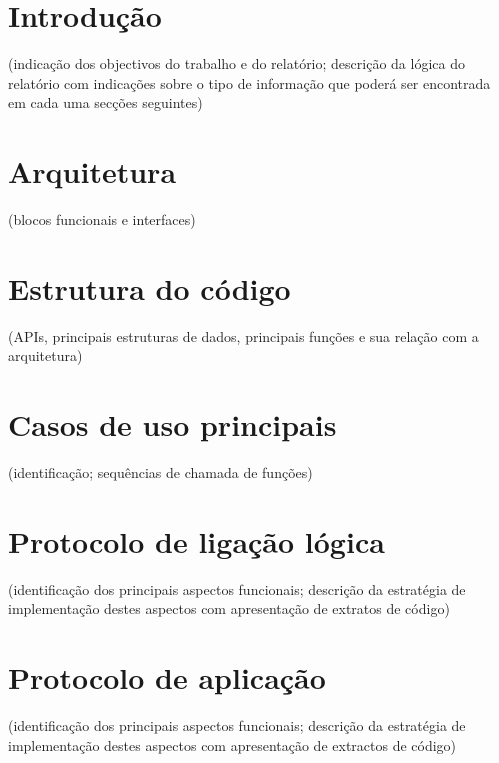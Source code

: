 \documentclass[11pt]{article}
\begin{document}
\section{Introdução}

 (indicação dos objectivos do trabalho e do relatório; descrição da lógica do relatório com indicações sobre o tipo de informação que poderá ser encontrada em cada uma secções seguintes)


\section{Arquitetura}

 (blocos funcionais e interfaces)


\section{Estrutura do código}

 (APIs, principais estruturas de dados, principais funções e sua relação com a arquitetura)

\section{Casos de uso principais}

 (identificação; sequências de chamada de funções)


\section{Protocolo de ligação lógica}

 (identificação dos principais aspectos funcionais; descrição da estratégia de implementação destes aspectos com apresentação de extratos de código)



\section{Protocolo de aplicação}
 (identificação dos principais aspectos funcionais; descrição da estratégia de implementação destes aspectos com apresentação de extractos de código)


\end{document}
